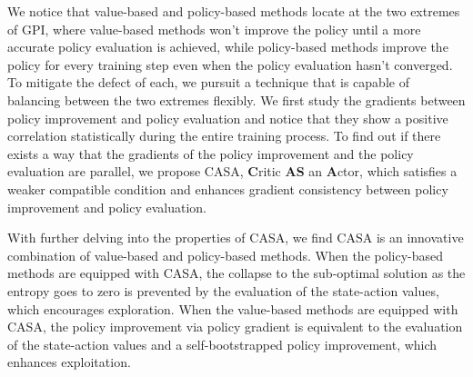 

We notice that value-based and policy-based methods locate at the two extremes of GPI, where value-based methods won't improve the policy until a more accurate policy evaluation is achieved, while policy-based methods improve the policy for every training step even when the policy evaluation hasn't converged. To mitigate the defect of each, we pursuit a technique that is capable of balancing  between the two extremes flexibly. 
We first study the gradients between policy improvement and policy evaluation and notice that they show a positive correlation statistically during the entire training process. To find out if there exists a way that the gradients of the policy improvement and the policy evaluation are parallel, we propose CASA, \textbf{C}ritic \textbf{AS} an \textbf{A}ctor, { which satisfies a weaker compatible condition \citep{sutton1999policy} and enhances gradient consistency between policy improvement and policy evaluation.}

With further delving into the properties of CASA, we find CASA is an innovative combination of value-based and policy-based methods. 
When the policy-based methods are equipped with CASA, the collapse to the sub-optimal solution as the entropy goes to zero is prevented by the evaluation of the state-action values, which encourages exploration.  
When the value-based methods are equipped with CASA, the policy improvement via policy gradient is equivalent to the evaluation of the state-action values and a self-bootstrapped policy improvement, which enhances exploitation.

